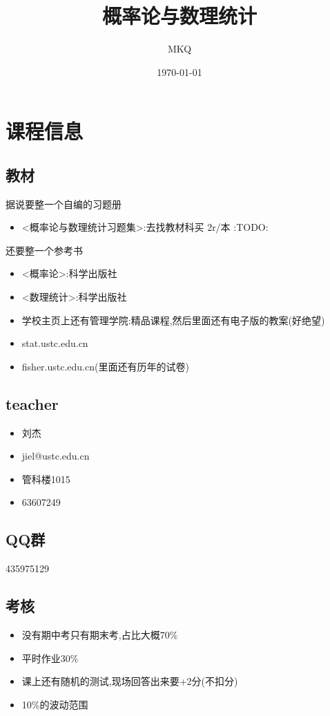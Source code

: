 \documentclass[11pt]{article}
\author{MKQ}
\date{\today}
\title{概率论与数理统计}
\begin{document}
\maketitle
\tableofcontents

\section{课程信息}
\label{sec:org7f97901}
\subsection{教材}
\label{sec:org0b3d973}
据说要整一个自编的习题册
\begin{itemize}
\item <概率论与数理统计习题集>:去找教材科买 2r/本 :TODO:
\end{itemize}

还要整一个参考书
\begin{itemize}
\item <概率论>:科学出版社
\item <数理统计>:科学出版社
\item 学校主页上还有管理学院:精品课程,然后里面还有电子版的教案(好绝望)
\item stat.ustc.edu.cn
\item fisher.ustc.edu.cn(里面还有历年的试卷)
\end{itemize}
\subsection{teacher}
\label{sec:org6dbd095}
\begin{itemize}
\item 刘杰
\item jiel@ustc.edu.cn
\item 管科楼1015
\item 63607249
\end{itemize}
\subsection{QQ群}
\label{sec:org7a78288}
435975129
\subsection{考核}
\label{sec:org9277713}
\begin{itemize}
\item 没有期中考只有期末考,占比大概70\%
\item 平时作业30\%
\item 课上还有随机的测试,现场回答出来要+2分(不扣分)
\item 10\%的波动范围
\end{itemize}
\end{document}
